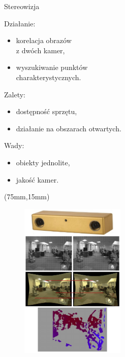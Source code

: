 \documentclass[xcolor=x11names,compress]{beamer}
\renewcommand{\(}{\begin{columns}}
\renewcommand{\)}{\end{columns}}
\newcommand{\<}[1]{\begin{column}{#1}}
\renewcommand{\>}{\end{column}}
\begin{document}
\begin{frame}{Stereowizja}

\alert{Działanie:}
\begin{itemize}
\item korelacja obrazów \\z dwóch kamer,
\item wyszukiwanie punktów \\charakterystycznych.
\end{itemize}

\vspace{.2cm}

\alert{Zalety:}
\begin{itemize}
\item dostępność sprzętu,
\item działanie na obszarach otwartych.
\end{itemize}

\vspace{.2cm}

\alert{Wady:}
\begin{itemize}
\item obiekty jednolite,
\item jakość kamer.
\end{itemize}

\begin{textblock*}{50mm}(75mm,15mm)%
    \begin{minipage}[l]{50mm}%

	\begin{figure}[h!]
    \centering
    \includegraphics[width=5.0cm]{../Common/img/stereo_steps_vert}
    \end{figure}

    \end{minipage}
\end{textblock*}

\end{frame}
\end{document}
